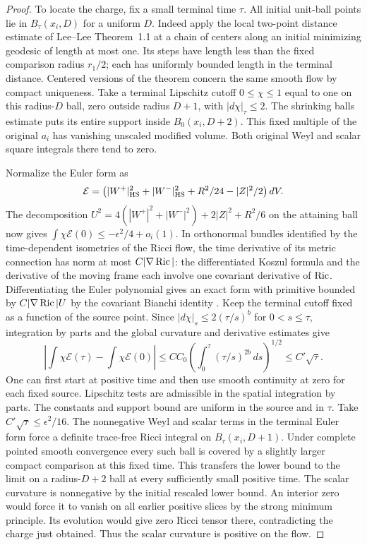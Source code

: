 \begin{proof}
To locate the charge, fix a small terminal time \(\tau\).
All initial unit-ball points lie in \(B_\tau(x_i,D)\) for a
uniform \(D\). Indeed apply the local two-point distance estimate
of Lee--Lee Theorem~1.1 at a chain of centers along an initial
minimizing geodesic of length at most one. Its steps have length
less than the fixed comparison radius \(r_1/2\); each has uniformly
bounded length in the terminal distance. Centered versions of the
theorem concern the same smooth flow by compact uniqueness. Take
a terminal Lipschitz cutoff \(0\le\chi\le1\) equal to one on
this radius-\(D\) ball, zero outside radius \(D+1\), with
\(|d\chi|_{\tau}\le2\). The shrinking balls estimate puts its
entire support inside \(B_0(x_i,D+2)\). This fixed multiple of
the original \(a_i\) has vanishing unscaled modified volume.
Both original Weyl and scalar square integrals there tend to zero.

Normalize the Euler form as
\[
 \mathcal E=\left(|W^+|_{\rm HS}^2+|W^-|_{\rm HS}^2
                 +R^2/24-|Z|^2/2\right)dV .
\]
The decomposition \(U^2=4(|W^+|^2+|W^-|^2)+2|Z|^2+R^2/6\)
on the attaining ball now gives
\(\int\chi\mathcal E(0)\le-\epsilon^2/4+o_i(1)\).
In orthonormal bundles identified by the time-dependent isometries
of the Ricci flow, the time derivative of its metric connection
has norm at most \(C|\nabla\operatorname{Ric}|\): the differentiated Koszul
formula and the derivative of the moving frame each involve one
covariant derivative of \(\operatorname{Ric}\). Differentiating the Euler
polynomial gives an exact form with primitive bounded by
\(C|\nabla\operatorname{Ric}|U\) by the covariant Bianchi identity
\cite[\S3]{ChernSimons1974Characteristic}.
Keep the terminal cutoff fixed as a function of the source point.
Since \(|d\chi|_s\le2(\tau/s)^b\) for \(0<s\le\tau\), integration
by parts and the global curvature and derivative estimates give
\[
 \left|\int\chi\mathcal E(\tau)-\int\chi\mathcal E(0)\right|
 \le C C_0\left(\int_0^\tau(\tau/s)^{2b}\,ds\right)^{1/2}
 \le C'\sqrt\tau .
\]
One can first start at positive time and then use smooth continuity
at zero for each fixed source. Lipschitz tests are admissible in
the spatial integration by parts. The constants and support bound
are uniform in the source and in \(\tau\). Take \(C'\sqrt\tau\le
\epsilon^2/16\). The nonnegative Weyl and scalar terms in the terminal
Euler form force a definite trace-free Ricci integral on
\(B_\tau(x_i,D+1)\). Under complete pointed smooth convergence
every such ball is covered by a slightly larger compact comparison
at this fixed time. This transfers the lower bound to the limit on
a radius-\(D+2\) ball at every sufficiently small positive time.
The scalar curvature is nonnegative by the initial rescaled lower
bound. An interior zero would force it to vanish on all earlier
positive slices by the strong minimum principle. Its evolution
would give zero Ricci tensor there, contradicting the charge
just obtained. Thus the scalar curvature is positive on the flow.
\end{proof}

